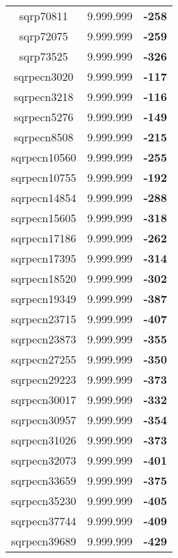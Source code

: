 \begin{tabular}{cc||c}
sqrp70811        & 9.999.999        & {\bf -258}      \\ 
sqrp72075        & 9.999.999        & {\bf -259}      \\ 
sqrp73525        & 9.999.999        & {\bf -326}      \\ 
sqrpecn3020      & 9.999.999        & {\bf -117}      \\ 
sqrpecn3218      & 9.999.999        & {\bf -116}      \\ 
sqrpecn5276      & 9.999.999        & {\bf -149}      \\ 
sqrpecn8508      & 9.999.999        & {\bf -215}      \\ 
sqrpecn10560     & 9.999.999        & {\bf -255}      \\ 
sqrpecn10755     & 9.999.999        & {\bf -192}      \\ 
sqrpecn14854     & 9.999.999        & {\bf -288}      \\ 
sqrpecn15605     & 9.999.999        & {\bf -318}      \\ 
sqrpecn17186     & 9.999.999        & {\bf -262}      \\ 
sqrpecn17395     & 9.999.999        & {\bf -314}      \\ 
sqrpecn18520     & 9.999.999        & {\bf -302}      \\ 
sqrpecn19349     & 9.999.999        & {\bf -387}      \\ 
sqrpecn23715     & 9.999.999        & {\bf -407}      \\ 
sqrpecn23873     & 9.999.999        & {\bf -355}      \\ 
sqrpecn27255     & 9.999.999        & {\bf -350}      \\ 
sqrpecn29223     & 9.999.999        & {\bf -373}      \\ 
sqrpecn30017     & 9.999.999        & {\bf -332}      \\ 
sqrpecn30957     & 9.999.999        & {\bf -354}      \\ 
sqrpecn31026     & 9.999.999        & {\bf -373}      \\ 
sqrpecn32073     & 9.999.999        & {\bf -401}      \\ 
sqrpecn33659     & 9.999.999        & {\bf -375}      \\ 
sqrpecn35230     & 9.999.999        & {\bf -405}      \\ 
sqrpecn37744     & 9.999.999        & {\bf -409}      \\ 
sqrpecn39689     & 9.999.999        & {\bf -429}      \\ 

\end{tabular}

